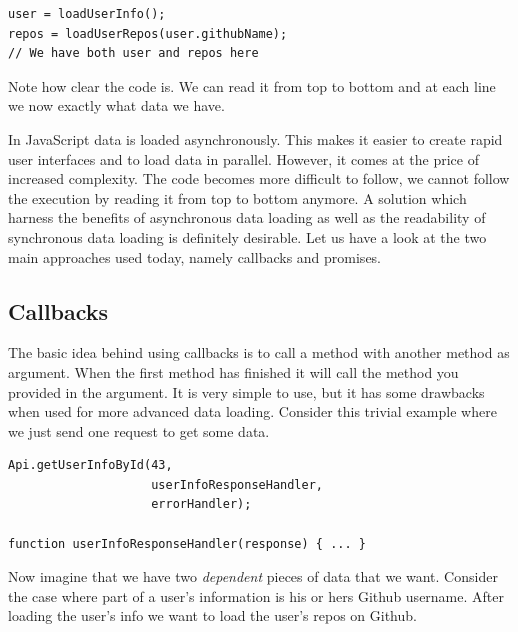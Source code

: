 \documentclass[a4paper,12pt]{article}
\begin{document}
\begin{lstlisting}[caption={Code showing how data loading might look like when done synchronously}, frame=single]
user = loadUserInfo();
repos = loadUserRepos(user.githubName);
// We have both user and repos here
\end{lstlisting}
Note how clear the code is. We can read it from top to bottom and at each line we now exactly what data we have.

In JavaScript data is loaded asynchronously. This makes it easier to create rapid user interfaces and to load data in parallel. However, it comes at the price of increased complexity.
The code becomes more difficult to follow, we cannot follow the execution by reading it from top to bottom anymore.
A solution which harness the benefits of asynchronous data loading as well as the readability of synchronous data loading is definitely desirable.
Let us have a look at the two main approaches used today, namely callbacks and promises.

\subsection{Callbacks}
The basic idea behind using callbacks is to call a method with another method as argument. When the first method has finished it will call the method you provided in the argument.
It is very simple to use, but it has some drawbacks when used for more advanced data loading. Consider this trivial example where we just send one request to get some data.

\begin{lstlisting}[caption=Code showing how we can load data using callbacks, frame=single]
Api.getUserInfoById(43, 
                    userInfoResponseHandler, 
                    errorHandler);

function userInfoResponseHandler(response) { ... }
\end{lstlisting}
Now imagine that we have two \emph{dependent} pieces of data that we want. Consider the case where part of a user's information is
his or hers Github username. After loading the user's info we want to load the user's repos on Github.
\end{document}
